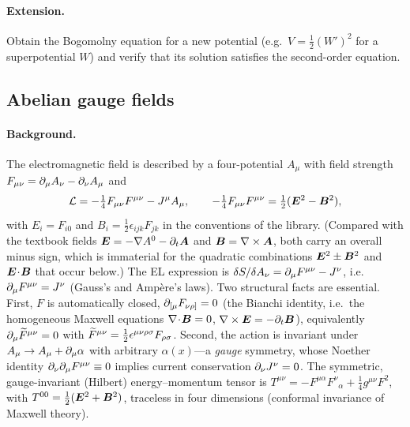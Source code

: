 \paragraph{Extension.} Obtain the Bogomolny equation for a new potential (e.g.\ $V=\tfrac12(W')^2$ for a superpotential $W$) and verify that its solution satisfies the second-order equation.

\subsection{Abelian gauge fields}


\paragraph{Background.} The electromagnetic field is described by a four-potential $A_\mu$ with field strength $F_{\mu\nu}=\partial_\mu A_\nu-\partial_\nu A_\mu$ and
\begin{equation}
\mathcal L=-\tfrac14F_{\mu\nu}F^{\mu\nu}-J^\mu A_\mu,\qquad
-\tfrac14F_{\mu\nu}F^{\mu\nu}=\tfrac12(\bm{E}^2-\bm{B}^2),
\end{equation}
with $E_i=F_{i0}$ and $B_i=\tfrac12\epsilon_{ijk}F_{jk}$ in the conventions of the library. (Compared with the textbook fields $\bm{E}=-\nabla A^0-\partial_t\bm{A}$ and $\bm{B}=\nabla\times\bm{A}$, both carry an overall minus sign, which is immaterial for the quadratic combinations $\bm{E}^2\pm\bm{B}^2$ and $\bm{E}\!\cdot\!\bm{B}$ that occur below.) The EL expression is $\delta S/\delta A_\nu=\partial_\mu F^{\mu\nu}-J^\nu$, i.e.\ $\partial_\mu F^{\mu\nu}=J^\nu$ (Gauss's and Amp\`ere's laws). Two structural facts are essential. First, $F$ is automatically closed, $\partial_{[\mu}F_{\nu\rho]}=0$ (the Bianchi identity, i.e.\ the homogeneous Maxwell equations $\nabla\!\cdot\!\bm{B}=0$, $\nabla\times\bm{E}=-\partial_t\bm{B}$), equivalently $\partial_\mu\widetilde{F}^{\mu\nu}=0$ with $\widetilde{F}^{\mu\nu}=\tfrac12\epsilon^{\mu\nu\rho\sigma}F_{\rho\sigma}$. Second, the action is invariant under $A_\mu\to A_\mu+\partial_\mu\alpha$ with arbitrary $\alpha(x)$---a \emph{gauge} symmetry, whose Noether identity $\partial_\nu\partial_\mu F^{\mu\nu}\equiv0$ implies current conservation $\partial_\nu J^\nu=0$. The symmetric, gauge-invariant (Hilbert) energy--momentum tensor is $T^{\mu\nu}=-F^{\mu\alpha}F^\nu{}_\alpha+\tfrac14g^{\mu\nu}F^2$, with $T^{00}=\tfrac12(\bm{E}^2+\bm{B}^2)$, traceless in four dimensions (conformal invariance of Maxwell theory).

